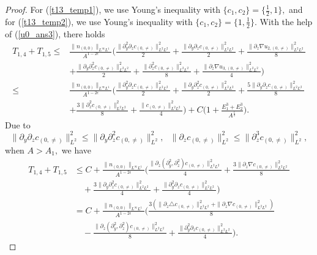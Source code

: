 \documentclass[10pt,a4paper]{amsart}
\begin{document}
\begin{proof}
		For (\ref{t13_temp1}), we use Young's inequality with $\{c_1,c_2\}=\{\frac{1}{2},1\},$ and 
		for (\ref{t13_temp2}), we use Young's inequality with $\{c_1,c_2\}=\{1,\frac12\}.$
		With the help of (\ref{u0_ans3}), 
		there holds
		\begin{equation*}
			\begin{aligned}
				T_{1,4}+T_{1,5}\leq& 
				\frac{\|n_{(0,0)}\|_{L^{\infty}L^1}}{A^{1-2\epsilon}}
				\Big(\frac{\|\partial_y^2\partial_zc_{(0,\neq)}\|^{2}_{L^2L^2}}{2}
				+\frac{\|\partial_y\partial_zc_{(0,\neq)}\|^{2}_{L^2L^2}}{2}
				+\frac{\|\partial_z\nabla u_{2,(0,\neq)}\|^{2}_{L^2L^2}}{8}\\&
				+\frac{\|\partial_y\partial_z^2c_{(0,\neq)}\|^{2}_{L^2L^2}}{2}
				+\frac{\|\partial_z^2c_{(0,\neq)}\|^{2}_{L^2L^2}}{8}
				+\frac{\|\partial_z\nabla u_{3,(0,\neq)}\|^{2}_{L^2L^2}}{4}\Big)\\
				\leq& 
				\frac{\|n_{(0,0)}\|_{L^{\infty}L^1}}{A^{1-2\epsilon}}
				\Big(\frac{\|\partial_y^2\partial_zc_{(0,\neq)}\|^{2}_{L^2L^2}}
				{2}
				+\frac{\|\partial_y\partial_z^2c_{(0,\neq)}\|^{2}_{L^2L^2}}{2}
				+\frac{5\|\partial_y\partial_zc_{(0,\neq)}\|^{2}_{L^2L^2}}{8}
				\\&
				+\frac{3 \|\partial_z^2c_{(0,\neq)}\|^{2}_{L^2L^2}}{8}
				+\frac{\|c_{(0,\neq)}\|^{2}_{L^2L^2}}{4}\Big)+C\Big(1+\frac{E_1^3+E_2^3}{A^{\frac{\epsilon}{2}}}\Big).
			\end{aligned}
		\end{equation*}
		Due to 
		$$\|\partial_y\partial_z c_{(0,\neq)}\|_{L^2}^2
		\leq \|\partial_y\partial_z^2 c_{(0,\neq)}\|_{L^2}^2,~~~
		\|\partial_z c_{(0,\neq)}\|_{L^2}^2
		\leq \|\partial_z^3 c_{(0,\neq)}\|_{L^2}^2,$$
		when $A>A_1,$ we have
		\begin{equation}\label{t14_1}
			\begin{aligned}
				T_{1,4}+T_{1,5}
				&\leq C+
				\frac{\|n_{(0,0)}\|_{L^{\infty}L^1}}{A^{1-2\epsilon}}
				\Big(\frac{\|\partial_z(\partial_y^2,\partial_z^2) c_{(0,\neq)}\|^{2}_{L^2L^2}}{4} 
				+\frac{3\|\partial_z\nabla c_{(0,\neq)}\|^{2}_{L^2L^2}}{8}\\
				&\quad +\frac{3\|\partial_y\partial_z^2 c_{(0,\neq)}\|^{2}_{L^2L^2}}{4}
				+\frac{\|\partial_y^2\partial_z c_{(0,\neq)}
					\|_{L^2L^2}^2}{4}\Big)\\
				&=C+
				\frac{\|n_{(0,0)}\|_{L^{\infty}L^1}}{A^{1-2\epsilon}}
				\Big(
				\frac{3(\|\partial_z\triangle c_{(0,\neq)}\|^{2}_{L^2L^2}	
					+\|\partial_z\nabla c_{(0,\neq)}\|^{2}_{L^2L^2})}{8}\\
				&\quad-\frac{\|\partial_z(\partial_y^2,\partial_z^2) c_{(0,\neq)}\|^{2}_{L^2L^2}}{8}
				+\frac{\|\partial_y^2\partial_z c_{(0,\neq)}\|_{L^2L^2}^2}{4} 
				\Big).
			\end{aligned}
		\end{equation}
		

\end{proof}
\end{document}
